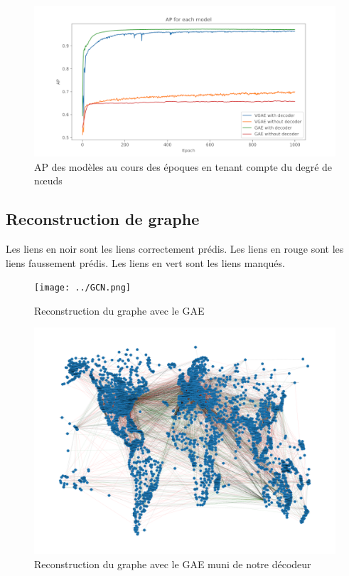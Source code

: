 \documentclass{article}
\begin{document}
\begin{figure}[H]
    \centering
    \includegraphics[width=1\linewidth]{../test_performance/avec_degre_0dropout/AP.png}
    \caption{AP des modèles au cours des époques en tenant compte du degré de nœuds}
    \label{fig:fig_AP_avec_degre}
\end{figure}

\subsection{Reconstruction de graphe}

Les liens en noir sont les liens correctement prédis.\newline
Les liens en rouge sont les liens faussement prédis.\newline
Les liens en vert sont les liens manqués.

\begin{figure}[H]
    \centering
    \texttt{[image: ../GCN.png]}
    \caption{Reconstruction du graphe avec le GAE}
    \label{fig:fig_graphe_GAE}
\end{figure}

\begin{figure}[H]
    \centering
    \includegraphics[width=1\linewidth]{../GCNwithDecoder.png}
    \caption{Reconstruction du graphe avec le GAE muni de notre décodeur}
    \label{fig:fig_graphe_GAE_with_decodeur}
\end{figure}
\end{document}
